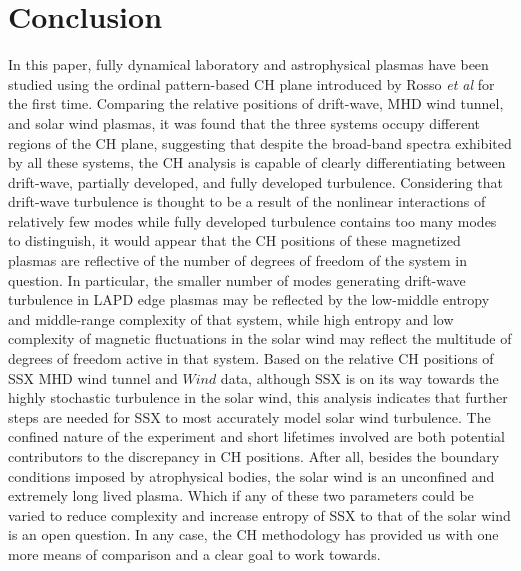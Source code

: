 \documentclass[aps,twocolumn,secnumarabic,nobalancelastpage,amsmath,amssymb,
nofootinbib]{revtex4-1}
\begin{document}
\section{Conclusion}
In this paper, fully dynamical laboratory and astrophysical plasmas have been studied using the ordinal pattern-based CH plane introduced by Rosso \textit{et al} for the first time. Comparing the relative positions of drift-wave, MHD wind tunnel, and solar wind plasmas, it was found that the three systems occupy different regions of the CH plane, suggesting that despite the broad-band spectra exhibited by all these systems, the CH analysis is capable of clearly differentiating between drift-wave, partially developed, and fully developed turbulence. Considering that drift-wave turbulence is thought to be a result of the nonlinear interactions of relatively few modes while fully developed turbulence contains too many modes to distinguish, it would appear that the CH positions of these magnetized plasmas are reflective of the number of degrees of freedom of the system in question. In particular, the smaller number of modes generating drift-wave turbulence in LAPD edge plasmas may be reflected by the low-middle entropy and middle-range complexity of that system, while high entropy and low complexity of magnetic fluctuations in the solar wind may reflect the multitude of degrees of freedom active in that system. Based on the relative CH positions of SSX MHD wind tunnel and $\textit{Wind}$ data, although SSX is on its way towards the highly stochastic turbulence in the solar wind, this analysis indicates that further steps are needed for SSX  to most accurately model solar wind turbulence. The confined nature of the experiment and short lifetimes involved are both potential contributors to the discrepancy in CH positions. After all, besides the boundary conditions imposed by atrophysical bodies, the solar wind is an unconfined and extremely long lived plasma. Which if any of these two parameters could be varied to reduce complexity and increase entropy of SSX  to that of the solar wind is an open question. In any case, the CH methodology has provided us with one more means of comparison and a clear goal to work towards.





\nocite{*}
\end{document}
